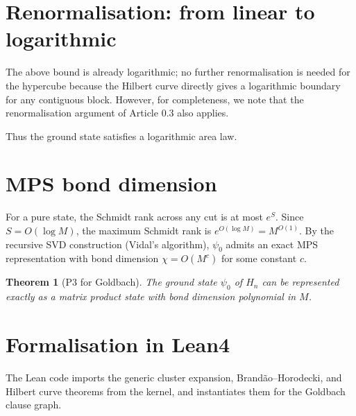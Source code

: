 \documentclass[11pt,a4paper]{article}
\newtheorem{theorem}{Theorem}[section]
\begin{document}
\section{Renormalisation: from linear to logarithmic}

The above bound is already logarithmic; no further renormalisation is needed for the hypercube because the Hilbert curve directly gives a logarithmic boundary for any contiguous block. However, for completeness, we note that the renormalisation argument of Article 0.3 also applies.

Thus the ground state satisfies a logarithmic area law.

\section{MPS bond dimension}

For a pure state, the Schmidt rank across any cut is at most \(e^{S}\). Since \(S = O(\log M)\), the maximum Schmidt rank is \(e^{O(\log M)} = M^{O(1)}\). By the recursive SVD construction (Vidal's algorithm), \(\psi_0\) admits an exact MPS representation with bond dimension \(\chi = O(M^c)\) for some constant \(c\).

\begin{theorem}[P3 for Goldbach]
The ground state \(\psi_0\) of \(H_n\) can be represented exactly as a matrix product state with bond dimension polynomial in \(M\).
\end{theorem}

\section{Formalisation in Lean4}

The Lean code imports the generic cluster expansion, Brandão–Horodecki, and Hilbert curve theorems from the kernel, and instantiates them for the Goldbach clause graph.
\end{document}
